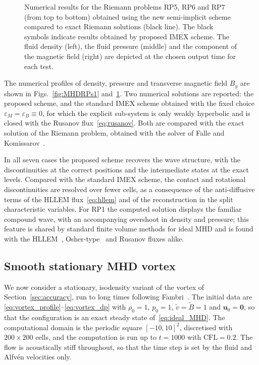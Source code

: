 \documentclass[a4paper,fleqn]{cas-sc}
\theoremstyle{remark}
\newcommand{\eps}{\varepsilon}
\newcommand{\epsM}{\eps_{M}}
\newcommand{\epsB}{\eps_{B}}
\begin{document}
\begin{figure}[pos=htbp]
    \caption{Numerical results for the Riemann problems RP5, RP6 and RP7 (from top to bottom) obtained using the new semi-implicit scheme compared to exact Riemann solutions (black line). The black symbols indicate results obtained by proposed IMEX scheme.
    The fluid density (left), the fluid pressure (middle) and the component of the magnetic field (right) are depicted at the chosen output time for each test.}
    \label{fig:MHDRPs2}
\end{figure}
The numerical profiles of density, pressure and transverse magnetic field
$B_y$ are shown in Figs.~\ref{fig:MHDRPs1} and~\ref{fig:MHDRPs2}. Two numerical
solutions are reported: the proposed scheme, and the standard IMEX scheme
obtained with the fixed choice $\epsM=\epsB\equiv0$, for which the explicit
sub-system is only weakly hyperbolic and is closed with the Rusanov
flux~\eqref{eq:rusanov}. %
Both are compared with the exact solution of the Riemann problem, obtained
with the solver of Falle and Komissarov~\cite{exact1,exact2}.

In all seven cases the proposed scheme recovers the wave structure, with the
discontinuities at the correct positions and the intermediate states at the
exact levels. %
Compared with the standard IMEX scheme, the contact and rotational
discontinuities are resolved over fewer cells, as a consequence of the
anti-diffusive terms of the HLLEM flux~\eqref{eq:hllem} and of the
reconstruction in the split characteristic variables.
For RP1 the computed solution displays the familiar compound wave, with an
accompanying overshoot in density and pressure; this feature is shared by
standard finite volume methods for ideal MHD and is found with the
HLLEM~\cite{HLLEM}, Osher-type~\cite{DumbserToro} and Rusanov fluxes
alike.

\subsection{Smooth stationary MHD vortex}\label{sec:stationary_vortex}

We now consider a stationary, isodensity variant of the vortex of Section~\ref{sec:accuracy},
run to long times following Fambri~\cite{Fambri2021}. The initial data are
\eqref{eq:vortex_profile}--\eqref{eq:vortex_dp} with $\rho_0=1$, $p_0=1$, $\tilde v=\tilde B=1$ and
$\mathbf u_0=\mathbf 0$, so that the configuration is an exact steady state of~\eqref{eq:ideal_MHD}.
The computational domain is the periodic square $[-10,10]^2$, discretised with
$200\times200$ cells, and the computation is run up to $t=1000$ with $\mathrm{CFL}=0.2$.
The flow is acoustically stiff throughout, so that the time step is set by the fluid and
Alfv\'en velocities only.
\end{document}
